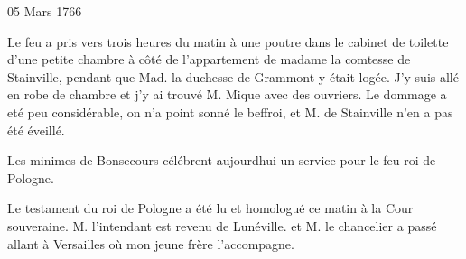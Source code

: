                      \begin{diary}{05 Mars 1766}{}

                         Le feu a pris vers trois heures du
                           matin
                           à une poutre dans le cabinet de toilette
                           d'une petite chambre à côté de l'appartement
                           de madame la comtesse de Stainville, pendant
                           que Mad. la duchesse de
                              Grammont
                           y était logée. J'y suis allé en robe de
                           chambre et j'y ai trouvé M. Mique
                           avec des ouvriers. Le dommage a eté
                           peu considérable, on n'a point sonné
                           le beffroi, et M. de
                              Stainville n'en a
                           pas été éveillé. \bigskip



                           Les minimes de Bonsecours
                           célébrent
                           aujourdhui un service pour le feu
                              roi de Pologne. \bigskip


                         Le testament du roi de Pologne a été lu et
                           homologué ce matin à la Cour
                              souveraine.
                           M. l'intendant est revenu de
                              Lunéville.
                           et M. le chancelier a passé
                           allant à
                           Versailles où mon jeune frère
                           l'accompagne. \bigskip


                     \end{diary}


